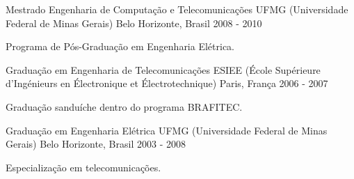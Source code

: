 

\begin{cventries}

  \cventry
    {Mestrado Engenharia de Computação e Telecomunicações} %
    {UFMG (Universidade Federal de Minas Gerais)} %
    {Belo Horizonte, Brasil} %
    {2008 - 2010} %
    {
      \begin{cvitems} %
        \item {Programa de Pós-Graduação em Engenharia Elétrica.}
      \end{cvitems}
    }

  \cventry
    {Graduação em Engenharia de Telecomunicações} %
    {ESIEE (École Supérieure d’Ingénieurs en Électronique et Électrotechnique)} %
    {Paris, França} %
    {2006 - 2007} %
    {
      \begin{cvitems} %
        \item {Graduação sanduíche dentro do programa BRAFITEC.}
      \end{cvitems}
    }


  \cventry
    {Graduação em Engenharia Elétrica} %
    {UFMG (Universidade Federal de Minas Gerais)} %
    {Belo Horizonte, Brasil} %
    {2003 - 2008}
    {
      \begin{cvitems} %
        \item {Especialização em telecomunicações.}
      \end{cvitems}
    }

\end{cventries}
